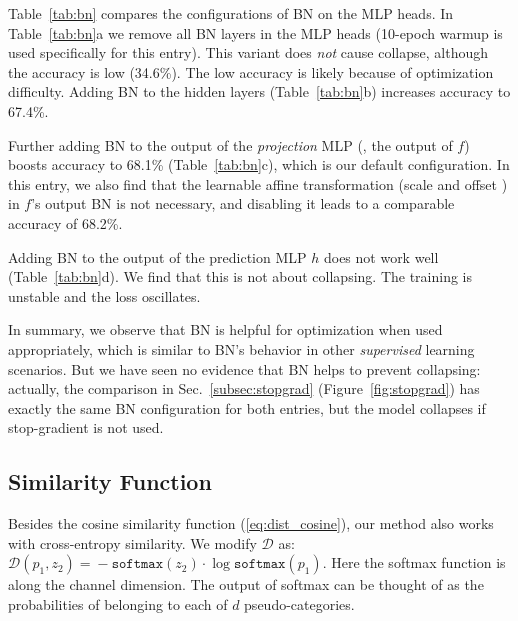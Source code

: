\documentclass[final]{cvpr}
\newcommand{\dist}{\mathcal{D}}
\newcommand{\p}{{p}}  %
\newcommand{\z}{{z}}  %
\begin{document}
Table~\ref{tab:bn} compares the configurations of BN on the MLP heads.
In Table~\ref{tab:bn}a we remove all BN layers in the MLP heads (10-epoch warmup \cite{Goyal2017} is used specifically for this entry).
This variant does \emph{not} cause collapse, although the accuracy is low (34.6\%). The low accuracy is likely because of optimization difficulty.
Adding BN to the hidden layers (Table~\ref{tab:bn}b) increases accuracy to 67.4\%.

Further adding BN to the output of the \emph{projection} MLP (\ie, the output of $f$) boosts accuracy to 68.1\% (Table~\ref{tab:bn}c), which is our default configuration. 
In this entry, we also find that the learnable affine transformation (scale and offset \cite{Ioffe2015}) in $f$'s output BN is not necessary, and disabling it leads to a comparable accuracy of 68.2\%.

Adding BN to the output of the prediction MLP $h$ does not work well (Table~\ref{tab:bn}d). We find that this is not about collapsing. The training is unstable and the loss oscillates.  

In summary, we observe that BN is helpful for optimization when used appropriately, which is similar to BN's behavior in other \emph{supervised} learning scenarios. But we have seen no evidence that BN helps to prevent collapsing: actually, the comparison in Sec.~\ref{subsec:stopgrad} (Figure~\ref{fig:stopgrad}) has exactly the same BN configuration for both entries, but the model collapses if stop-gradient is not used.

\subsection{Similarity Function} \label{subsec:similarity}

Besides the cosine similarity function (\ref{eq:dist_cosine}), our method also works with cross-entropy similarity.
We modify $\dist$ as: $\dist(\p_1, \z_2)\!=\!{-}\texttt{softmax}({\z_2}){\cdot} \log \texttt{softmax}({\p_1})$. Here the softmax function is along the channel dimension. The output of softmax can be thought of as the probabilities of belonging to each of $d$ pseudo-categories.
\end{document}
